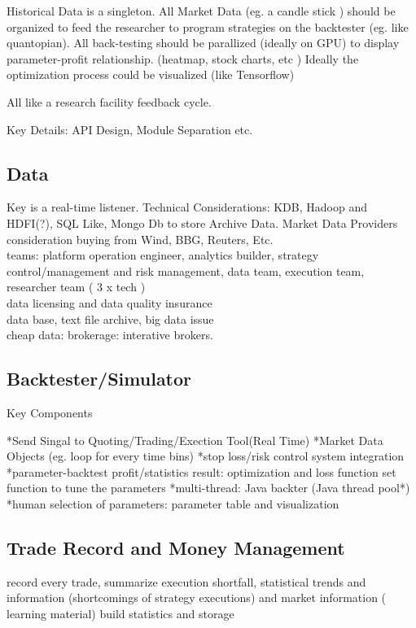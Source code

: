 \documentclass[11pt, openany]{book}              %
\begin{document}
Historical Data is a singleton. All Market Data (eg. a candle stick ) should be organized to feed the researcher to program strategies on the backtester (eg. like quantopian). All back-testing should be parallized (ideally on GPU) to display parameter-profit relationship. (heatmap, stock charts, etc ) Ideally the optimization process could be visualized (like Tensorflow) 

All like a research facility feedback cycle. 

Key Details: API Design, Module Separation etc. 
\subsection{Data}

Key is a real-time listener. Technical Considerations: KDB, Hadoop and HDFI(?), SQL Like, Mongo Db to store Archive Data. Market Data Providers consideration buying from Wind, BBG, Reuters, Etc. \\

teams: platform operation engineer, analytics builder, strategy control/management and risk management, data team, execution team, researcher team ( 3 x tech )\\

data licensing and data quality insurance \\

data base, text file archive, big data issue\\

cheap data: brokerage: interative brokers.

\subsection{Backtester/Simulator}

Key Components

*Send Singal to Quoting/Trading/Exection Tool(Real Time)
*Market Data Objects (eg. loop for every time bins)
*stop loss/risk control system integration
*parameter-backtest profit/statistics result: optimization and loss function set function to tune the parameters
*multi-thread: Java backter (Java thread pool*)
*human selection of parameters: parameter table and visualization

\subsection{Trade Record and Money Management}

record every trade, summarize execution shortfall, statistical trends and information (shortcomings of strategy executions) and market information ( learning material) build statistics and storage
\end{document}
